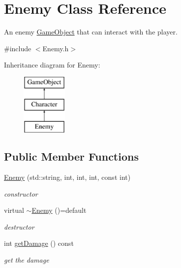 \hypertarget{class_enemy}{}\section{Enemy Class Reference}
\label{class_enemy}


An enemy \mbox{\hyperlink{class_game_object}{Game\+Object}} that can interact with the player.  




{\ttfamily \#include $<$Enemy.\+h$>$}

Inheritance diagram for Enemy\+:\begin{figure}[H]
\begin{center}
\leavevmode
\includegraphics[height=3.000000cm]{class_enemy}
\end{center}
\end{figure}
\subsection*{Public Member Functions}
\begin{DoxyCompactItemize}
\item 
\mbox{\label{class_enemy_af847b3e65f5845b7894bc514ca47174b}} 
\mbox{\hyperlink{class_enemy_af847b3e65f5845b7894bc514ca47174b}{Enemy}} (std\+::string, int, int, int, const int)
\begin{DoxyCompactList}\small\item\em constructor \end{DoxyCompactList}\item 
\mbox{\label{class_enemy_aafb628c66008e33afdd750e2f492bd98}} 
virtual \mbox{\hyperlink{class_enemy_aafb628c66008e33afdd750e2f492bd98}{$\sim$\+Enemy}} ()=default
\begin{DoxyCompactList}\small\item\em destructor \end{DoxyCompactList}\item 
\mbox{\label{class_enemy_abb68708af5f493bee8516d1dce35797e}} 
int \mbox{\hyperlink{class_enemy_abb68708af5f493bee8516d1dce35797e}{get\+Damage}} () const
\begin{DoxyCompactList}\small\item\em get the damage \end{DoxyCompactList}\end{DoxyCompactItemize}


